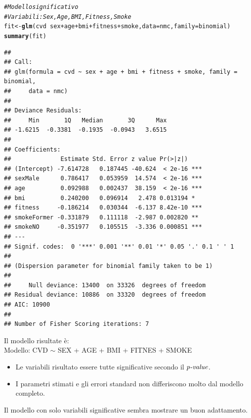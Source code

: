 \documentclass{article}\usepackage[]{graphicx}\usepackage[]{xcolor}
\makeatletter
\newcommand{\hlcom}[1]{\textcolor[rgb]{0.678,0.584,0.686}{\textit{#1}}}%
\newcommand{\hlopt}[1]{\textcolor[rgb]{0,0,0}{#1}}%
\newcommand{\hlstd}[1]{\textcolor[rgb]{0.345,0.345,0.345}{#1}}%
\newcommand{\hlkwb}[1]{\textcolor[rgb]{0.69,0.353,0.396}{#1}}%
\newcommand{\hlkwc}[1]{\textcolor[rgb]{0.333,0.667,0.333}{#1}}%
\newcommand{\hlkwd}[1]{\textcolor[rgb]{0.737,0.353,0.396}{\textbf{#1}}}%
\newenvironment{kframe}{%
 \def\at@end@of@kframe{}%
 \ifinner\ifhmode%
  \def\at@end@of@kframe{\end{minipage}}%
  \begin{minipage}{\columnwidth}%
 \fi\fi%
 \def\FrameCommand##1{\hskip\@totalleftmargin \hskip-\fboxsep
 \colorbox{shadecolor}{##1}\hskip-\fboxsep
     \hskip-\linewidth \hskip-\@totalleftmargin \hskip\columnwidth}%
 \MakeFramed {\advance\hsize-\width
   \@totalleftmargin\z@ \linewidth\hsize
   \@setminipage}}%
 {\par\unskip\endMakeFramed%
 \at@end@of@kframe}
\newenvironment{knitrout}{}{} %
\makeatother
\begin{document}
\begin{knitrout}
\color{fgcolor}\begin{kframe}
\begin{alltt}
\hlcom{#Modello significativo}
\hlcom{#Variabili: Sex, Age, BMI, Fitness, Smoke }
\hlstd{fit} \hlkwb{<-} \hlkwd{glm}\hlstd{(cvd}\hlopt{~}\hlstd{sex}\hlopt{+}\hlstd{age}\hlopt{+}\hlstd{bmi}\hlopt{+}\hlstd{fitness}\hlopt{+}\hlstd{smoke,}\hlkwc{data}\hlstd{=nmc,}\hlkwc{family}\hlstd{=binomial)}
\hlkwd{summary}\hlstd{(fit)}
\end{alltt}
\begin{verbatim}
## 
## Call:
## glm(formula = cvd ~ sex + age + bmi + fitness + smoke, family = binomial, 
##     data = nmc)
## 
## Deviance Residuals: 
##     Min       1Q   Median       3Q      Max  
## -1.6215  -0.3381  -0.1935  -0.0943   3.6515  
## 
## Coefficients:
##              Estimate Std. Error z value Pr(>|z|)    
## (Intercept) -7.614728   0.187445 -40.624  < 2e-16 ***
## sexMale      0.786417   0.053959  14.574  < 2e-16 ***
## age          0.092988   0.002437  38.159  < 2e-16 ***
## bmi          0.240200   0.096914   2.478 0.013194 *  
## fitness     -0.186214   0.030344  -6.137 8.42e-10 ***
## smokeFormer -0.331879   0.111118  -2.987 0.002820 ** 
## smokeNO     -0.351977   0.105515  -3.336 0.000851 ***
## ---
## Signif. codes:  0 '***' 0.001 '**' 0.01 '*' 0.05 '.' 0.1 ' ' 1
## 
## (Dispersion parameter for binomial family taken to be 1)
## 
##     Null deviance: 13400  on 33326  degrees of freedom
## Residual deviance: 10886  on 33320  degrees of freedom
## AIC: 10900
## 
## Number of Fisher Scoring iterations: 7
\end{verbatim}
\end{kframe}
\end{knitrout}
    
    Il modello risultate è: \\
    Modello: CVD $\sim$ SEX + AGE + BMI + FITNES + SMOKE
    \begin{itemize}
      \item Le variabili risultato essere tutte significative secondo il 
            $\emph{p-value}$.
      \item I parametri stimati e gli errori standard non differiscono molto dal 
            modello completo.
    \end{itemize}
    
    Il modello con solo variabili significative sembra mostrare un buon 
    adattamento.
  
\end{document}
